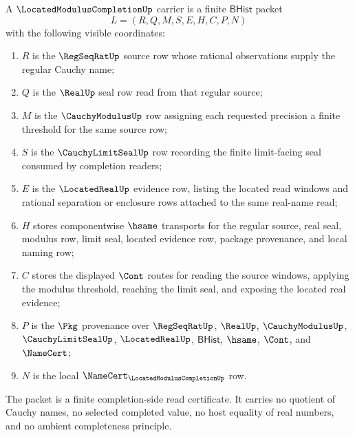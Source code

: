 \begin{definition}
\label{def:located-modulus-completion-carrier}
A $\LocatedModulusCompletionUp$ carrier is a finite $\mathsf{BHist}$ packet
$$
L=(R,Q,M,S,E,H,C,P,N)
$$
with the following visible coordinates:
\begin{enumerate}
\item $R$ is the $\RegSeqRatUp$ source row whose rational observations supply the regular Cauchy name;
\item $Q$ is the $\RealUp$ seal row read from that regular source;
\item $M$ is the $\CauchyModulusUp$ row assigning each requested precision a finite threshold for the same source row;
\item $S$ is the $\CauchyLimitSealUp$ row recording the finite limit-facing seal consumed by completion readers;
\item $E$ is the $\LocatedRealUp$ evidence row, listing the located read windows and rational separation or enclosure rows attached to the same real-name read;
\item $H$ stores componentwise $\hsame$ transports for the regular source, real seal, modulus row, limit seal, located evidence row, package provenance, and local naming row;
\item $C$ stores the displayed $\Cont$ routes for reading the source windows, applying the modulus threshold, reaching the limit seal, and exposing the located real evidence;
\item $P$ is the $\Pkg$ provenance over $\RegSeqRatUp$, $\RealUp$, $\CauchyModulusUp$, $\CauchyLimitSealUp$, $\LocatedRealUp$, $\mathsf{BHist}$, $\hsame$, $\Cont$, and $\NameCert$;
\item $N$ is the local $\NameCert_{\LocatedModulusCompletionUp}$ row.
\end{enumerate}
The packet is a finite completion-side read certificate. It carries no quotient of Cauchy names, no selected completed value, no host equality of real numbers, and no ambient completeness principle.
\end{definition}

